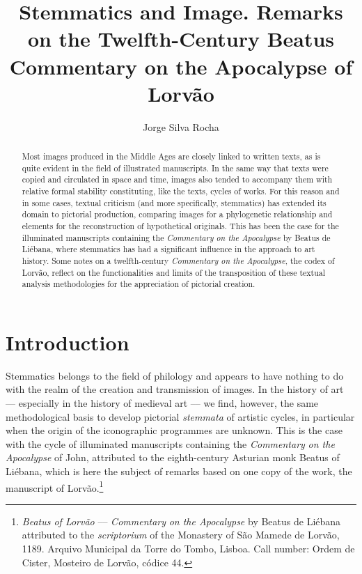 \documentclass{article}
\author{Jorge Silva Rocha}
\title{Stemmatics and Image. Remarks on the Twelfth-Century Beatus Commentary on the Apocalypse of Lorvão}
\begin{document}
\renewcommand*{\pagemark}{}

\begin{abstract}
Most images produced in the Middle Ages are closely linked to written
texts, as is quite evident in the field of illustrated manuscripts. In
the same way that texts were copied and circulated in space and time,
images also tended to accompany them with relative formal stability
constituting, like the texts, cycles of works. For this reason and in
some cases, textual criticism (and more specifically, stemmatics) has
extended its domain to pictorial production, comparing images for a
phylogenetic relationship and elements for the reconstruction of
hypothetical originals. This has been the case for the illuminated
manuscripts containing the \emph{Commentary} \emph{on the Apocalypse} by
Beatus de Liébana, where stemmatics has had a significant influence in
the approach to art history. Some notes on a twelfth-century
\emph{Commentary} \emph{on the Apocalypse}, the codex of Lorvão, reflect
on the functionalities and limits of the transposition of these textual
analysis methodologies for the appreciation of pictorial creation.
\end{abstract}


\section*{Introduction} 
Stemmatics belongs to the field of philology and appears to have nothing
to do with the realm of the creation and transmission of images. In the
history of art ––  especially in the history of medieval art ––  we
find, however, the same methodological basis to develop pictorial
\emph{stemmata} of artistic cycles, in particular when the origin of the
iconographic programmes are unknown. This is the case with the cycle of
illuminated manuscripts containing the \emph{Commentary} \emph{on the
Apocalypse} of John, attributed to the eighth-century Asturian monk
Beatus of Liébana, which is here the subject of remarks based on one
copy of the work, the manuscript of Lorvão.\footnote{\emph{Beatus of Lorvão} –– 
  \emph{Commentary} \emph{on the Apocalypse} by Beatus de Liébana
  attributed to the \emph{scriptorium} of the Monastery of São Mamede de
  Lorvão, 1189. Arquivo Municipal da Torre do Tombo, Lisboa. Call
  number: Ordem de Cister, Mosteiro de Lorvão, códice 44.}
\end{document}
